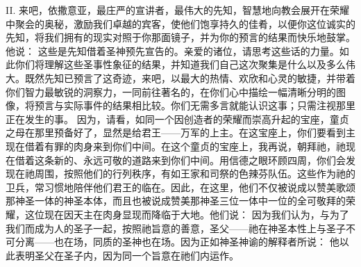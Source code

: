 II. 来吧，依撒意亚，最庄严的宣讲者，最伟大的先知，智慧地向教会展开在荣耀中聚会的奥秘，激励我们卓越的宾客，使他们饱享持久的佳肴，以便你这位诚实的先知，将我们拥有的现实对照于你那面镜子，并为你的预言的结果而快乐地鼓掌。他说： 这些是先知借着圣神预先宣告的。亲爱的诸位，请思考这些话的力量。如此你们将理解这些圣事性象征的结果，并知道我们自己这次聚集是什么以及多么伟大。既然先知已预言了这奇迹，来吧，以最大的热情、欢欣和心灵的敏捷，并带着你们智力最敏锐的洞察力，一同前往著名的，在你们心中描绘一幅清晰分明的图像，将预言与实际事件的结果相比较。你们无需多言就能认识这事；只需注视那里正在发生的事。 因为，请看，如同一个因创造者的荣耀而崇高升起的宝座，童贞之母在那里预备好了，显然是给君王——万军的上主。在这宝座上，你们要看到主现在借着有罪的肉身来到你们中间。在这个童贞的宝座上，我再说，朝拜祂，祂现在借着这条新的、永远可敬的道路来到你们中间。用信德之眼环顾四周，你们会发现在祂周围，按照他们的行列秩序，有如王家和司祭的色辣芬队伍。这些作为祂的卫兵，常习惯地陪伴他们君王的临在。因此，在这里，他们不仅被说成以赞美歌颂那神圣一体的神圣本体，而且也被说成赞美那神圣三位一体中一位的全可敬拜的荣耀，这位现在因天主在肉身显现而降临于大地。他们说： 因为我们认为，与为了我们而成为人的圣子一起，按照祂旨意的善意，圣父——祂在神圣本性上与圣子不可分离——也在场，同质的圣神也在场。因为正如神圣神谕的解释者所说： 他以此表明圣父在圣子内，因为同一个旨意在祂们内运作。\par

